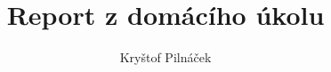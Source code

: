\documentclass[]{article}
\title{Report z domácího úkolu}
\author{Kryštof Pilnáček}
\begin{document}
\maketitle

\begin{abstract}

\end{abstract}

\section{}
\end{document}
